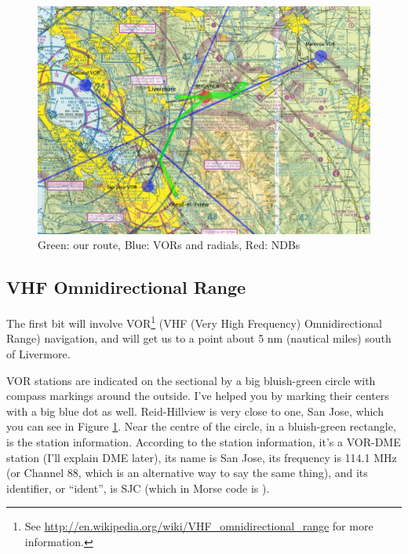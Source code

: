 \begin{figure}
  \begin{center}
    \includegraphics[width=20cm, angle=-90]{img/sectional_labelled}
    \caption{Green: our route, Blue: VORs and radials, Red: NDBs}
    \label{fig:sectional_labelled}
  \end{center}
\end{figure}


\subsection{VHF Omnidirectional Range}

The first bit will involve VOR\footnote{See
  \url{http://en.wikipedia.org/wiki/VHF_omnidirectional_range} for
  more information.} (VHF (Very High Frequency) Omnidirectional Range)
navigation, and will get us to a point about 5 nm (nautical miles)
south of Livermore.

VOR stations are indicated on the sectional by a big bluish-green
circle with compass markings around the outside.  I've helped you by
marking their centers with a big blue dot as well.  Reid-Hillview is
very close to one, San Jose, which you can see in Figure
\ref{fig:sectional_labelled}.  Near the centre of the circle, in a
bluish-green rectangle, is the station information.  According to the
station information, it's a VOR-DME station (I'll explain DME later),
its name is San Jose, its frequency is 114.1 MHz (or Channel 88, which
is an alternative way to say the same thing), and its identifier, or
``ident'', is SJC (which in Morse code is \mdot\mdot\mdot\mspace
\mdot\mdash\mdash\mdash\mspace \mdash\mdot\mdash\mdot).

